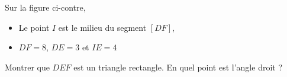 
\begin{exercice}\label{exo2smath-0260}

    Sur la figure ci-contre,
    \begin{itemize}
        \item Le point \( I\) est le milieu du segment \( [DF]\),
        \item \( DF=8\), \( DE=3\) et \( IE=4\)
    \end{itemize}
    Montrer que \( DEF\) est un triangle rectangle. En quel point est l'angle droit ?



\begin{center}
    
\end{center}



\end{exercice}
